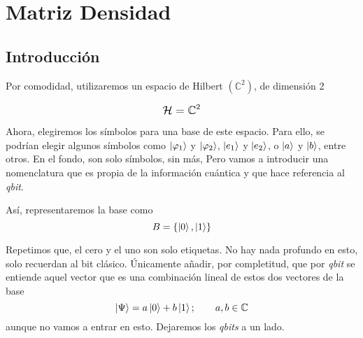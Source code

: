 %
%

\chapter{Matriz Densidad}

\section{Introducción}
Por comodidad, utilizaremos un espacio de Hilbert $\left(\mathbb{C}^2\right)$,
de dimensión 2

\[
  \mathlarger{\mathcal{H} = \mathbb{C}^2}
\]

Ahora, elegiremos los símbolos para una base de este espacio. Para ello, se
podrían elegir algunos símbolos como $\ket{\varphi_1}$ y $\ket{\varphi_2}$,
$\ket{e_1}$ y $\ket{e_2}$, o $\ket{a}$ y $\ket{b}$, entre otros. En el fondo,
son solo símbolos, sin más, Pero vamos a introducir una nomenclatura que es
propia de la información cuántica y que hace referencia al \emph{qbit}.

Así, representaremos la base\footnotemark{} como
\[
  B = \{\ket{0}, \ket{1}\}
\]

Repetimos que, el cero y el uno son solo etiquetas. No hay nada profundo en
esto, solo recuerdan al bit clásico. Únicamente añadir, por completitud, que
por \emph{qbit} se entiende aquel vector que es una combinación lineal de estos
dos vectores de la base
\[
  \ket{\Psi} = a \ket{0} + b \ket{1} ;
  \hspace{2em} a, b \in \mathbb{C}
\]
aunque no vamos a entrar en esto. Dejaremos los \emph{qbits} a un lado.

